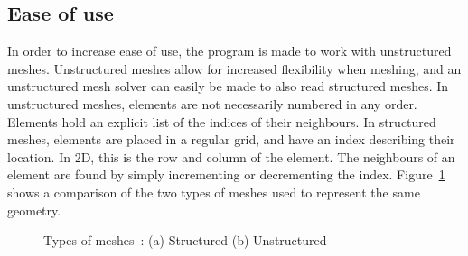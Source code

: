 \subsection{Ease of use}\label{subsection:graphics_processing_units:data_structure:ease_of_use}

In order to increase ease of use, the program is made to work with unstructured meshes. Unstructured
meshes allow for increased flexibility when meshing, and an unstructured mesh solver can easily be
made to also read structured meshes. In unstructured meshes, elements are not necessarily numbered
in any order. Elements hold an explicit list of the indices of their neighbours. In structured
meshes, elements are placed in a regular grid, and have an index describing their location. In 2D,
this is the row and column of the element. The neighbours of an element are found by simply
incrementing or decrementing the index. Figure~\ref{fig:mesh_types} shows a comparison of the two
types of meshes used to represent the same geometry. 

\begin{figure}[H]
	\centering
	\hfill
	\caption{Types of meshes~\cite{Clucas1999}: (a) Structured (b) Unstructured}\label{fig:mesh_types}
\end{figure}

